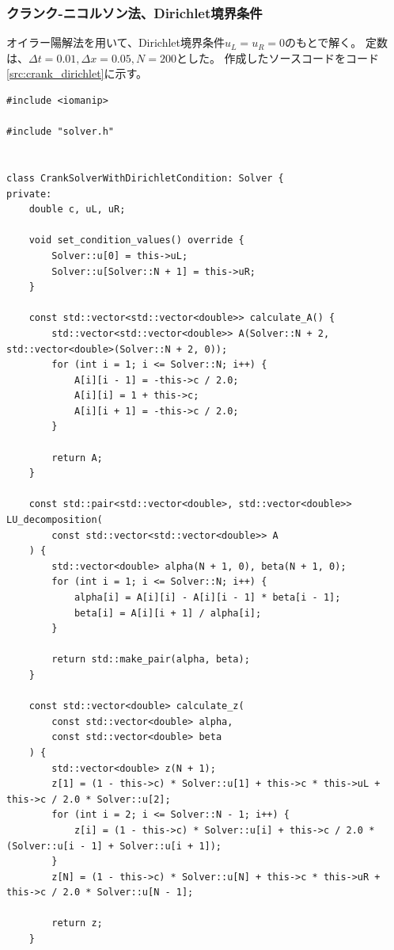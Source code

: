 \documentclass[a4j, titlepage]{jsarticle}
\numberwithin{equation}{section}
\begin{document}
        \subsubsection{クランク-ニコルソン法、Dirichlet境界条件}
            オイラー陽解法を用いて、Dirichlet境界条件$u_L = u_R = 0$のもとで解く。
            定数は、$\Delta t = 0.01, \Delta x = 0.05, N = 200$とした。
            作成したソースコードをコード\ref{src:crank_dirichlet}に示す。
            \begin{lstlisting}[caption=クランク-ニコルソン法を用いてDirichlet境界条件のもとで解くソースコード, label=src:crank_dirichlet]
#include <iomanip>

#include "solver.h"


class CrankSolverWithDirichletCondition: Solver {
private:
    double c, uL, uR;

    void set_condition_values() override {
        Solver::u[0] = this->uL;
        Solver::u[Solver::N + 1] = this->uR;
    }

    const std::vector<std::vector<double>> calculate_A() {
        std::vector<std::vector<double>> A(Solver::N + 2, std::vector<double>(Solver::N + 2, 0));
        for (int i = 1; i <= Solver::N; i++) {
            A[i][i - 1] = -this->c / 2.0;
            A[i][i] = 1 + this->c;
            A[i][i + 1] = -this->c / 2.0;
        }

        return A;
    }

    const std::pair<std::vector<double>, std::vector<double>> LU_decomposition(
        const std::vector<std::vector<double>> A
    ) {
        std::vector<double> alpha(N + 1, 0), beta(N + 1, 0);
        for (int i = 1; i <= Solver::N; i++) {
            alpha[i] = A[i][i] - A[i][i - 1] * beta[i - 1];
            beta[i] = A[i][i + 1] / alpha[i];
        }

        return std::make_pair(alpha, beta);
    }

    const std::vector<double> calculate_z(
        const std::vector<double> alpha,
        const std::vector<double> beta
    ) {
        std::vector<double> z(N + 1);
        z[1] = (1 - this->c) * Solver::u[1] + this->c * this->uL + this->c / 2.0 * Solver::u[2];
        for (int i = 2; i <= Solver::N - 1; i++) {
            z[i] = (1 - this->c) * Solver::u[i] + this->c / 2.0 * (Solver::u[i - 1] + Solver::u[i + 1]);
        }
        z[N] = (1 - this->c) * Solver::u[N] + this->c * this->uR + this->c / 2.0 * Solver::u[N - 1];

        return z;
    }


\end{lstlisting}
\end{document}
